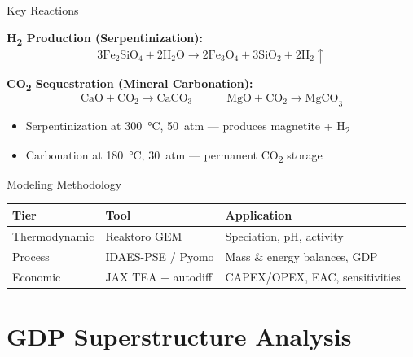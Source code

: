 \documentclass[aspectratio=169]{beamer}
\begin{document}
\begin{frame}{Key Reactions}

\textbf{H\textsubscript{2} Production (Serpentinization):}
\begin{equation*}
  3\text{Fe}_2\text{SiO}_4 + 2\text{H}_2\text{O}
  \longrightarrow 2\text{Fe}_3\text{O}_4 + 3\text{SiO}_2 + 2\text{H}_2 \uparrow
\end{equation*}

\vspace{12pt}
\textbf{CO\textsubscript{2} Sequestration (Mineral Carbonation):}
\begin{equation*}
  \text{CaO} + \text{CO}_2 \longrightarrow \text{CaCO}_3
  \qquad\quad
  \text{MgO} + \text{CO}_2 \longrightarrow \text{MgCO}_3
\end{equation*}

\vspace{12pt}
\begin{itemize}
  \item Serpentinization at \SI{300}{\celsius}, \SI{50}{atm} --- produces magnetite + H\textsubscript{2}
  \item Carbonation at \SI{180}{\celsius}, \SI{30}{atm} --- permanent CO\textsubscript{2} storage
\end{itemize}
\end{frame}

\begin{frame}{Modeling Methodology}

\centering
\begin{tabular}{p{2.5cm}p{3.8cm}p{5cm}}
\toprule
\textbf{Tier} & \textbf{Tool} & \textbf{Application} \\
\midrule
Thermodynamic & Reaktoro GEM & Speciation, pH, activity \\
Process & IDAES-PSE / Pyomo & Mass \& energy balances, GDP \\
Economic & JAX TEA + autodiff & CAPEX/OPEX, EAC, sensitivities \\
\bottomrule
\end{tabular}
\end{frame}

\section{GDP Superstructure Analysis}
\end{document}
